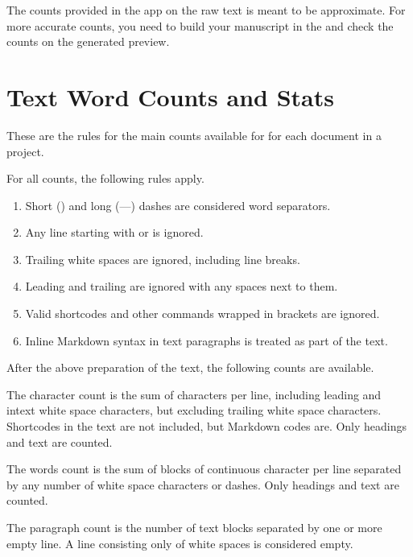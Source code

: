 \documentclass[a4paper,11pt,english]{sphinxmanual}
\begin{document}
\sphinxAtStartPar
The counts provided in the app on the raw text is meant to be approximate. For more accurate
counts, you need to build your manuscript in the  and check the counts on the
generated preview.


\section{Text Word Counts and Stats}
\label{\detokenize{more_counting:text-word-counts-and-stats}}
\sphinxAtStartPar
These are the rules for the main counts available for for each document in a project.

\sphinxAtStartPar
For all counts, the following rules apply.
\begin{enumerate}
%
\item {} 
\sphinxAtStartPar
Short (\textendash{}) and long (—) dashes are considered word separators.

\item {} 
\sphinxAtStartPar
Any line starting with \sphinxcode{\sphinxupquote{\%}} or  is ignored.

\item {} 
\sphinxAtStartPar
Trailing white spaces are ignored, including line breaks.

\item {} 
\sphinxAtStartPar
Leading \sphinxcode{\sphinxupquote{\textgreater{}}} and trailing \sphinxcode{\sphinxupquote{\textless{}}} are ignored with any spaces next to them.

\item {} 
\sphinxAtStartPar
Valid shortcodes and other commands wrapped in brackets \sphinxcode{\sphinxupquote{{[}{]}}} are ignored.

\item {} 
\sphinxAtStartPar
In\sphinxhyphen{}line Markdown syntax in text paragraphs is treated as part of the text.

\end{enumerate}

\sphinxAtStartPar
After the above preparation of the text, the following counts are available.
\begin{description}
\sphinxAtStartPar
The character count is the sum of characters per line, including leading and in\sphinxhyphen{}text white space
characters, but excluding trailing white space characters. Shortcodes in the text are not
included, but Markdown codes are. Only headings and text are counted.

\sphinxAtStartPar
The words count is the sum of blocks of continuous character per line separated by any number of
white space characters or dashes. Only headings and text are counted.

\sphinxAtStartPar
The paragraph count is the number of text blocks separated by one or more empty line. A line
consisting only of white spaces is considered empty.

\end{description}
\end{document}
